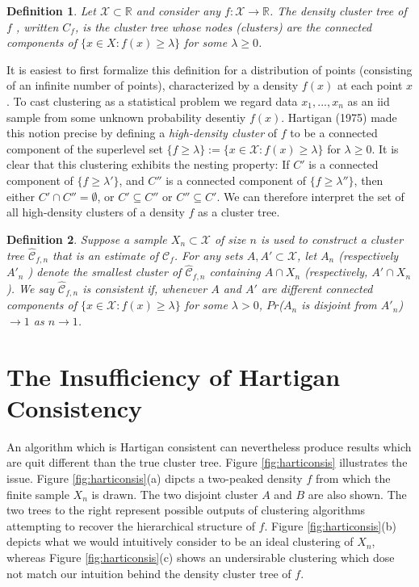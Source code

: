 \documentclass{article}
\newtheorem{definition}{Definition}
\begin{document}
\begin{definition}
Let $\mathcal{X} \subset \mathbb{R}$ and consider any $f : \mathcal{X} \rightarrow \mathbb{R}$. The density cluster tree of $f$ , written $C_f$, is the cluster tree whose nodes (clusters) are the {\color{red} connected components} of $\{x \in X : f(x) \geq \lambda\}$ for some $\lambda \geq 0$.
\end{definition}

It is easiest to first formalize this definition for a distribution of points (consisting of an infinite number of points), characterized by a density $f(x)$ at each point $x$. To cast clustering as a statistical problem we regard data $x_1, ..., x_n$ as an iid sample from some unknown probability desentiy $f(x)$. Hartigan (1975) made this notion precise by defining a \emph{high-density cluster} of $f$ to be a connected component of the superlevel set $\{f \geq \lambda \} := \{ x \in \mathcal{X} : f(x) \geq \lambda\}$ for $\lambda \geq 0$. It is clear that this clustering exhibits the nesting property: If $C'$ is a connected component of $\{f \geq \lambda'\}$, and $C''$ is a connected component of $\{f \geq \lambda''\}$, then either ${C}' \cap {C}'' = \emptyset $, or ${C}' \subseteq {C}''$ or ${C}'' \subseteq {C}'$. We can therefore interpret the set of all high-density clusters of a density $f$ as a cluster tree.

\begin{definition}
Suppose a sample $X_n \subset \mathcal X$ of size $n$ is used to construct a cluster tree ${\hat{\mathcal{C}}_{f,n}}$ that is an estimate of $\mathcal{C}_f$. For any sets $A, A' \subset \mathcal X$, let $A_n$ (respectively $A'_n$ ) denote
the smallest cluster of ${\hat{\mathcal{C}}_{f,n}}$ containing $A \cap X_n$ (respectively, $A' \cap X_n$). We say ${\hat{\mathcal{C}}_{f,n}}$ is consistent if, whenever $A$ and $A'$ are different connected components of $\{ x \in \mathcal{X} : f(x) \geq \lambda\}$ for some $\lambda > 0$, $Pr$($A_n$ is disjoint from $A'_n$) $\rightarrow 1$ as $n \rightarrow 1$.
\end{definition}



\section{The Insufficiency of Hartigan Consistency} 

An algorithm which is Hartigan consistent can nevertheless produce results which are quit different than the true cluster tree. Figure \ref{fig:harticonsis} illustrates the issue. Figure \ref{fig:harticonsis}(a) dipcts a two-peaked density $f$ from which the finite sample $X_n$ is drawn. The two disjoint cluster $A$ and $B$ are also shown. The two trees to the right represent possible outputs of clustering algorithms attempting to recover the hierarchical structure of $f$. Figure \ref{fig:harticonsis}(b) depicts what we would intuitively consider to be an ideal clustering of $X_n$, whereas Figure \ref{fig:harticonsis}(c) shows an undersirable clustering which dose not match our intuition behind the density cluster tree of $f$.
\end{document}

